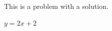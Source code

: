 \begin{problem}
  This is a problem with a solution.
  \begin{answer}
    $y = 2x + 2$
  \end{answer}
\end{problem}
